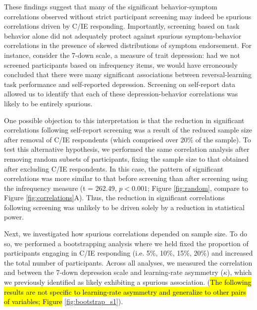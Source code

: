 \documentclass[a4paper,notitlepage,12pt]{article}
\begin{document}
\begin{refsection}[main]
These findings suggest that many of the significant behavior-symptom correlations observed without strict participant screening may indeed be spurious correlations driven by C/IE responding. Importantly, screening based on task behavior alone did not adequately protect against spurious symptom-behavior correlations in the presence of skewed distributions of symptom endorsement. For instance, consider the 7-down scale, a measure of trait depression: had we not screened participants based on infrequency items, we would have erroneously concluded that there were many significant associations between reversal-learning task performance and self-reported depression. Screening on self-report data allowed us to identify that each of these depression-behavior correlations was likely to be entirely spurious.

One possible objection to this interpretation is that the reduction in significant correlations following self-report screening was a result of the reduced sample size after removal of C/IE respondents (which comprised over 20\% of the sample). To test this alternative hypothesis, we performed the same correlation analysis after removing random subsets of participants, fixing the sample size to that obtained after excluding C/IE respondents. In this case, the pattern of significant correlations was more similar to that before screening than after screening using the infrequency measure (t = 262.49, $p < 0.001$; Figure \ref{fig:random}, compare to Figure \ref{fig:correlations}A). Thus, the reduction in significant correlations following screening was unlikely to be driven solely by a reduction in statistical power.

Next, we investigated how spurious correlations depended on sample size. To do so, we performed a bootstrapping analysis where we held fixed the proportion of participants engaging in C/IE responding (i.e. 5\%, 10\%, 15\%, 20\%) and increased the total number of participants. Across all analyses, we measured the correlation and between the 7-down depression scale and learning-rate asymmetry ($\kappa$), which we previously identified as likely exhibiting a spurious association. (\hl{The following results are not specific to learning-rate asymmetry and generalize to other pairs of variables; Figure} \ref{fig:bootstrap_s1}).  


\end{refsection}
\end{document}
